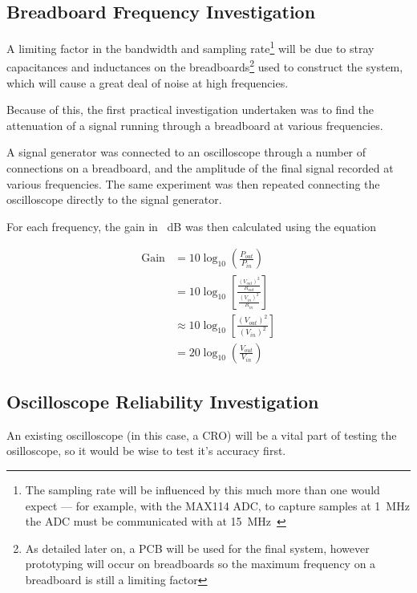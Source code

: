 \subsection{Breadboard Frequency Investigation}

A limiting factor in the bandwidth and sampling rate\footnote{The sampling rate
will be influenced by this much more than one would expect --- for example, with
the MAX114 ADC, to capture samples at \SI{1}{\MHz} the ADC must be communicated
with at \SI{15}{\MHz}~\autocite{MAX114}} will be due to stray capacitances and
inductances on the breadboards\footnote{As detailed later on, a PCB will be used
for the final system, however prototyping will occur on breadboards so the
maximum frequency on a breadboard is still a limiting factor} used to construct
the system, which will cause a great deal of noise at high frequencies.

Because of this, the first practical investigation undertaken was to find the
attenuation of a signal running through a breadboard at various frequencies.

A signal generator was connected to an oscilloscope through a number of
connections on a breadboard, and the amplitude of the final signal recorded at
various frequencies. The same experiment was then repeated connecting the
oscilloscope directly to the signal generator.

For each frequency, the gain in \SI{}{\dB} was then calculated using the
equation

\begin{align*}
\text{Gain} & = 10\log_{10}\left(\frac{P_{out}}{P_{in}}\right)\\
            & = 10\log_{10}\left[\frac{\frac{\left(V_{out}\right)^2}{R_{out}}}{\frac{\left(V_{in}\right)^2}{R_{in}}}\right]\\
            & \approx 10\log_{10}\left[\frac{\left(V_{out}\right)^2}{\left(V_{in}\right)^2}\right]\\
            & = 20\log_{10}\left(\frac{V_{out}}{V_{in}}\right)
\end{align*}


\subsection{Oscilloscope Reliability Investigation}

An existing oscilloscope (in this case, a CRO) will be a vital part of testing
the osilloscope, so it would be wise to test it's accuracy first.

